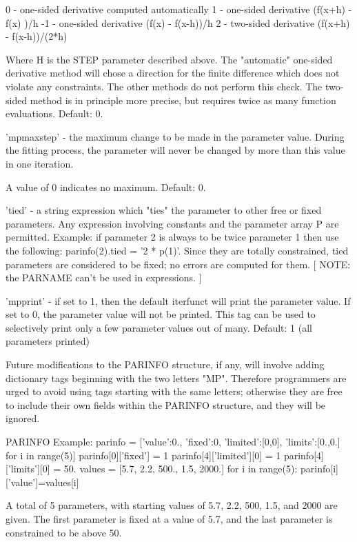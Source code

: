 \begin{DoxyVerb}
     0 - one-sided derivative computed automatically
     1 - one-sided derivative (f(x+h) - f(x)  )/h
    -1 - one-sided derivative (f(x)   - f(x-h))/h
     2 - two-sided derivative (f(x+h) - f(x-h))/(2*h)

 Where H is the STEP parameter described above.  The
 "automatic" one-sided derivative method will chose a
 direction for the finite difference which does not
 violate any constraints.  The other methods do not
 perform this check.  The two-sided method is in
 principle more precise, but requires twice as many
 function evaluations.  Default: 0.

    'mpmaxstep' - the maximum change to be made in the parameter
     value.  During the fitting process, the parameter
     will never be changed by more than this value in
     one iteration.

     A value of 0 indicates no maximum.  Default: 0.

    'tied' - a string expression which "ties" the parameter to other
free or fixed parameters.  Any expression involving
constants and the parameter array P are permitted.
Example: if parameter 2 is always to be twice parameter
1 then use the following: parinfo(2).tied = '2 * p(1)'.
Since they are totally constrained, tied parameters are
considered to be fixed; no errors are computed for them.
[ NOTE: the PARNAME can't be used in expressions. ]

    'mpprint' - if set to 1, then the default iterfunct will print the
   parameter value.  If set to 0, the parameter value
   will not be printed.  This tag can be used to
   selectively print only a few parameter values out of
   many.  Default: 1 (all parameters printed)


 Future modifications to the PARINFO structure, if any, will involve
 adding dictionary tags beginning with the two letters "MP".
 Therefore programmers are urged to avoid using tags starting with
 the same letters; otherwise they are free to include their own
 fields within the PARINFO structure, and they will be ignored.

 PARINFO Example:
 parinfo = [{'value':0., 'fixed':0, 'limited':[0,0], 'limits':[0.,0.]} 
                                    for i in range(5)]
 parinfo[0]['fixed'] = 1
 parinfo[4]['limited'][0] = 1
 parinfo[4]['limits'][0]  = 50.
 values = [5.7, 2.2, 500., 1.5, 2000.]
 for i in range(5): parinfo[i]['value']=values[i]

 A total of 5 parameters, with starting values of 5.7,
 2.2, 500, 1.5, and 2000 are given.  The first parameter
 is fixed at a value of 5.7, and the last parameter is
 constrained to be above 50.



\end{DoxyVerb}
